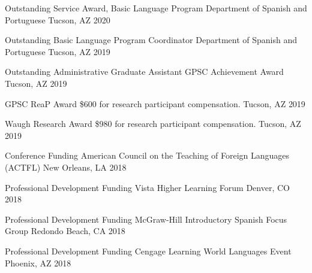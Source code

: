 \begin{cvhonors}


\cvhonor
{Outstanding Service Award, Basic Language Program} %
{Department of Spanish and Portuguese} %
{Tucson, AZ} %
{2020} %


\cvhonor
{Outstanding Basic Language Program Coordinator} %
{Department of Spanish and Portuguese} %
{Tucson, AZ} %
{2019} %

\cvhonor
{Outstanding Administrative Graduate Assistant} %
{GPSC Achievement Award} %
{Tucson, AZ} %
{2019} %


\cvhonor
{GPSC ReaP Award} %
{\$600 for research participant compensation.} %
{Tucson, AZ} %
{2019} %


\cvhonor
{Waugh Research Award} %
{\$980 for research participant compensation.} %
{Tucson, AZ} %
{2019} %


\cvhonor
{Conference Funding} %
{American Council on the Teaching of Foreign Languages (ACTFL) } %
{New Orleans, LA} %
{2018} %


\cvhonor
{Professional Development Funding} %
{Vista Higher Learning Forum } %
{Denver, CO} %
{2018} %


\cvhonor
{Professional Development Funding} %
{McGraw-Hill Introductory Spanish Focus Group} %
{Redondo Beach, CA} %
{2018} %


\cvhonor
{Professional Development Funding} %
{Cengage Learning World Languages Event} %
{Phoenix, AZ} %
{2018} %




\end{cvhonors}

